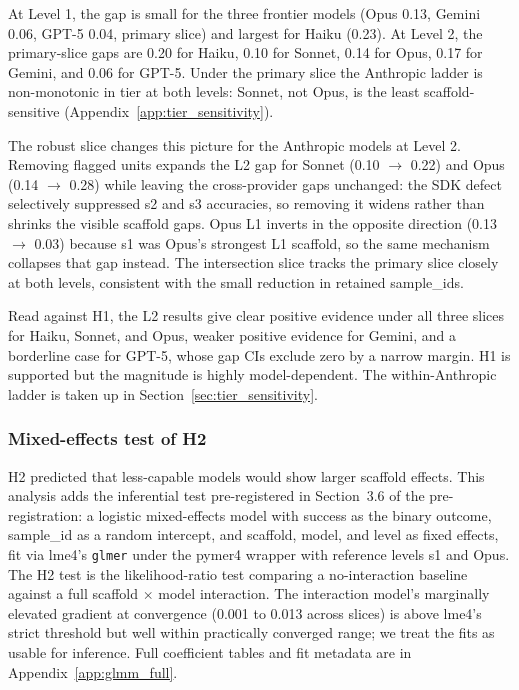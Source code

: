 \documentclass[10pt]{article} %
\begin{document}
            At Level 1, the gap is small for the three frontier models (Opus 0.13, Gemini 0.06, GPT-5 0.04, primary slice) and largest for Haiku (0.23). At Level 2, the primary-slice gaps are 0.20 for Haiku, 0.10 for Sonnet, 0.14 for Opus, 0.17 for Gemini, and 0.06 for GPT-5. Under the primary slice the Anthropic ladder is non-monotonic in tier at both levels: Sonnet, not Opus, is the least scaffold-sensitive (Appendix~\ref{app:tier_sensitivity}).
    
            The robust slice changes this picture for the Anthropic models at Level 2. Removing flagged units expands the L2 gap for Sonnet (0.10 $\to$ 0.22) and Opus (0.14 $\to$ 0.28) while leaving the cross-provider gaps unchanged: the SDK defect selectively suppressed s2 and s3 accuracies, so removing it widens rather than shrinks the visible scaffold gaps. Opus L1 inverts in the opposite direction (0.13 $\to$ 0.03) because s1 was Opus's strongest L1 scaffold, so the same mechanism collapses that gap instead. The intersection slice tracks the primary slice closely at both levels, consistent with the small reduction in retained sample\_ids.
    
            Read against H1, the L2 results give clear positive evidence under all three slices for Haiku, Sonnet, and Opus, weaker positive evidence for Gemini, and a borderline case for GPT-5, whose gap CIs exclude zero by a narrow margin. H1 is supported but the magnitude is highly model-dependent. The within-Anthropic ladder is taken up in Section~\ref{sec:tier_sensitivity}.

        \subsubsection{Mixed-effects test of H2}\label{sec:h2_inferential}
        
            H2 predicted that less-capable models would show larger scaffold effects. This analysis adds the inferential test pre-registered in Section~3.6 of the pre-registration: a logistic mixed-effects model with success as the binary outcome, sample\_id as a random intercept, and scaffold, model, and level as fixed effects, fit via lme4's \texttt{glmer} under the pymer4 wrapper with reference levels s1 and Opus. The H2 test is the likelihood-ratio test comparing a no-interaction baseline against a full scaffold $\times$ model interaction. The interaction model's marginally elevated gradient at convergence (0.001 to 0.013 across slices) is above lme4's strict threshold but well within practically converged range; we treat the fits as usable for inference. Full coefficient tables and fit metadata are in Appendix~\ref{app:glmm_full}.
        
\end{document}
